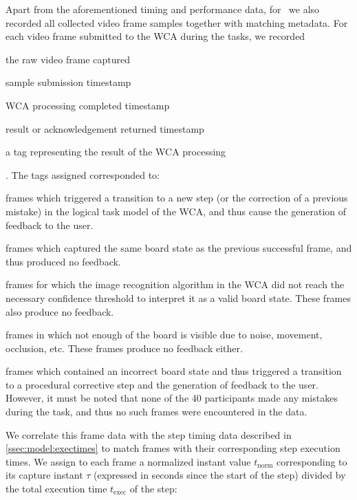 Apart from the aforementioned timing and performance data, for~\cite{olguinmunoz2021impact} we also recorded all collected video frame samples together with matching metadata.
For each video frame submitted to the \ac{WCA} during the tasks, we recorded
\begin{enumerate*}[itemjoin={{; }}, itemjoin*={{; and }}]
    \item the raw video frame captured
    \item sample submission timestamp
    \item \ac{WCA} processing completed timestamp
    \item result or acknowledgement returned timestamp
    \item a tag representing the result of the \ac{WCA} processing
\end{enumerate*}.
The tags assigned corresponded to:
\begin{description}[font={\bfseries\ttfamily}, wide]
    \item[SUCCESS:] frames which triggered a transition to a new step (or the correction of a previous mistake) in the logical task model of the \ac{WCA}, and thus cause the generation of feedback to the user.
    \item[REPEAT:] frames which captured the same board state as the previous successful frame, and thus produced no feedback.
    \item[LOW\_CONFIDENCE] frames for which the image recognition algorithm in the \ac{WCA} did not reach the necessary confidence threshold to interpret it as a valid board state.
        These frames also produce no feedback.
    \item[BLANK] frames in which not enough of the board is visible due to noise, movement, occlusion, etc.
        These frames produce no feedback either.
    \item[TASK\_ERROR] frames which contained an incorrect board state and thus triggered a transition to a procedural corrective step and the generation of feedback to the user.
        However, it must be noted that none of the \num{40} participants made any mistakes during the task, and thus no such frames were encountered in the data.
\end{description}

We correlate this frame data with the step timing data described in \cref{ssec:model:exectimes} to match frames with their corresponding step execution times.
We assign to each frame a normalized instant value \( t_\text{norm} \) corresponding to its capture instant \( \tau \) (expressed in seconds since the start of the step) divided by the total execution time \( t_\text{exec} \) of the step:

